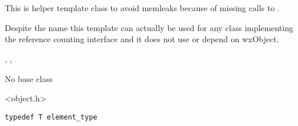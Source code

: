 \section{}\label{wxobjectdataptr}

This is helper template class to avoid memleaks because of missing calls
to .

Despite the name this template can actually be used for any
class implementing the reference counting interface and it
does not use or depend on wxObject.


,
,


No base class


<object.h>


{\small%
\begin{verbatim}
typedef T element_type
\end{verbatim}
}%


